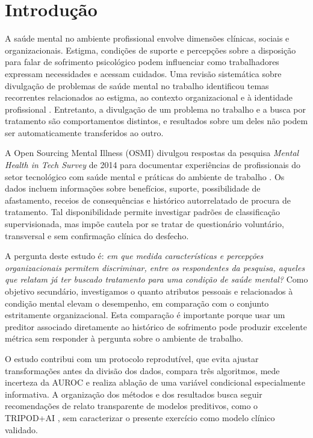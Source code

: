 \documentclass[11pt,a4paper]{article}
\begin{document}
\section{Introdução}\label{sec:introducao}

A saúde mental no ambiente profissional envolve dimensões clínicas, sociais e organizacionais. Estigma, condições de suporte e percepções sobre a disposição para falar de sofrimento psicológico podem influenciar como trabalhadores expressam necessidades e acessam cuidados. Uma revisão sistemática sobre divulgação de problemas de saúde mental no trabalho identificou temas recorrentes relacionados ao estigma, ao contexto organizacional e à identidade profissional \cite{mcgrath2023disclosure}. Entretanto, a divulgação de um problema no trabalho e a busca por tratamento são comportamentos distintos, e resultados sobre um deles não podem ser automaticamente transferidos ao outro.

A Open Sourcing Mental Illness (OSMI) divulgou respostas da pesquisa \textit{Mental Health in Tech Survey} de 2014 para documentar experiências de profissionais do setor tecnológico com saúde mental e práticas do ambiente de trabalho \cite{osmi2014,osmi_research}. Os dados incluem informações sobre benefícios, suporte, possibilidade de afastamento, receios de consequências e histórico autorrelatado de procura de tratamento. Tal disponibilidade permite investigar padrões de classificação supervisionada, mas impõe cautela por se tratar de questionário voluntário, transversal e sem confirmação clínica do desfecho.

A pergunta deste estudo é: \textit{em que medida características e percepções organizacionais permitem discriminar, entre os respondentes da pesquisa, aqueles que relatam já ter buscado tratamento para uma condição de saúde mental?} Como objetivo secundário, investigamos o quanto atributos pessoais e relacionados à condição mental elevam o desempenho, em comparação com o conjunto estritamente organizacional. Esta comparação é importante porque usar um preditor associado diretamente ao histórico de sofrimento pode produzir excelente métrica sem responder à pergunta sobre o ambiente de trabalho.

O estudo contribui com um protocolo reprodutível, que evita ajustar transformações antes da divisão dos dados, compara três algoritmos, mede incerteza da AUROC e realiza ablação de uma variável condicional especialmente informativa. A organização dos métodos e dos resultados busca seguir recomendações de relato transparente de modelos preditivos, como o TRIPOD+AI \cite{collins2024tripodai}, sem caracterizar o presente exercício como modelo clínico validado.
\end{document}
